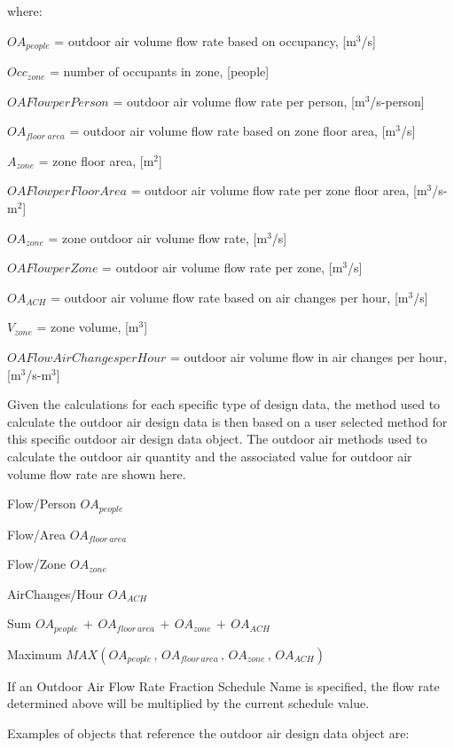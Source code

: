 where:

\(O{A_{people}}\) = outdoor air volume flow rate based on occupancy, {[}m\(^{3}\)/s{]}

\(Oc{c_{zone}}\) = number of occupants in zone, {[}people{]}

\(OAFlowperPerson\) = outdoor air volume flow rate per person, {[}m\(^{3}\)/s-person{]}

\(O{A_{floor\;area}}\) = outdoor air volume flow rate based on zone floor area, {[}m\(^{3}\)/s{]}

\({A_{zone}}\) = zone floor area, {[}m\(^{2}\){]}

\(OAFlowperFloorArea\) = outdoor air volume flow rate per zone floor area, {[}m\(^{3}\)/s-m\(^{2}\){]}

\(O{A_{zone}}\) = zone outdoor air volume flow rate, {[}m\(^{3}\)/s{]}

\(OAFlowperZone\) = outdoor air volume flow rate per zone, {[}m\(^{3}\)/s{]}

\(O{A_{ACH}}\) = outdoor air volume flow rate based on air changes per hour, {[}m\(^{3}\)/s{]}

\({V_{zone}}\) = zone volume, {[}m\(^{3}\){]}

\(OAFlowAirChangesperHour\) = outdoor air volume flow in air changes per hour, {[}m\(^{3}\)/s-m\(^{3}\){]}

Given the calculations for each specific type of design data, the method used to calculate the outdoor air design data is then based on a user selected method for this specific outdoor air design data object. The outdoor air methods used to calculate the outdoor air quantity and the associated value for outdoor air volume flow rate are shown here.

Flow/Person \Rightarrow \(O{A_{people}}\)

Flow/Area \Rightarrow \(O{A_{floor\,area}}\)

Flow/Zone \Rightarrow \(O{A_{zone}}\)

AirChanges/Hour \Rightarrow \(O{A_{ACH}}\)

Sum \Rightarrow \(O{A_{people}}\, + \,O{A_{floor\,area}}\, + \,O{A_{zone}}\, + \,O{A_{ACH}}\)

Maximum \Rightarrow \(MAX\left( {O{A_{people}}\,,\,O{A_{floor\,area}}\,,\,O{A_{zone}}\,,\,O{A_{ACH}}} \right)\)

If an Outdoor Air Flow Rate Fraction Schedule Name is specified, the flow rate determined above will be multiplied by the current schedule value.

Examples of objects that reference the outdoor air design data object are:

